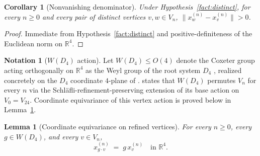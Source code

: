 \documentclass[11pt, a4paper]{amsart}
\newtheorem{lemma}[theorem]{Lemma}
\newtheorem{corollary}[theorem]{Corollary}
\theoremstyle{definition}
\newtheorem{notation}[theorem]{Notation}
\newcommand{\R}{\mathbb{R}}
\begin{document}
\begin{corollary}[Nonvanishing denominator]
\label{cor:nonvanishing}
Under Hypothesis~\ref{fact:distinct}, for every $n \geq 0$ and
every pair of distinct vertices $v, w \in V_n$,
$\|x_w^{(n)} - x_v^{(n)}\| > 0$.
\end{corollary}

\begin{proof}
Immediate from Hypothesis~\ref{fact:distinct} and
positive-definiteness of the Euclidean norm on $\R^4$.
\end{proof}

\begin{notation}[$W(D_4)$ action]
\label{not:wd4}
Let $W(D_4) \leq O(4)$ denote the Coxeter group acting
orthogonally on $\R^4$ as the Weyl group of the root system
$D_4$ \cite[Ch.~1]{Humphreys}, realized concretely on the $D_4$
coordinate $4$-plane of \cite[\S 3]{AlgebraicSubstrate}.
\cite[Prop.~2.6]{RefinementSpaces} states that $W(D_4)$ permutes
$V_n$ for every $n$ via the Schl\"{a}fli-refinement-preserving
extension of its base action on $V_0 = V_{24}$. Coordinate
equivariance of this vertex action is proved below in
Lemma~\ref{lem:coord-equivariance}.
\end{notation}

\begin{lemma}[Coordinate equivariance on refined vertices]
\label{lem:coord-equivariance}
For every $n \geq 0$, every $g \in W(D_4)$, and every $v \in V_n$,
\[
  x_{g \cdot v}^{(n)} \;=\; g\,x_v^{(n)} \quad \text{in } \R^4.
\]
\end{lemma}
\end{document}
